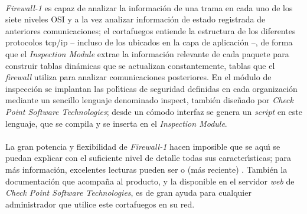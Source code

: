 \\{\it Firewall-1} es capaz de analizar la informaci\'on de una trama en cada
uno de los siete niveles OSI y a la vez analizar informaci\'on de estado 
registrada de anteriores comunicaciones; el cortafuegos entiende la estructura
de los diferentes protocolos {\sc tcp/ip} -- incluso de los ubicados en la
capa de aplicaci\'on --, de forma que el {\it Inspection Module} extrae 
la informaci\'on relevante de cada paquete para construir tablas din\'amicas
que se actualizan constantemente, tablas que el {\it firewall} utiliza para
analizar comunicaciones posteriores. En el m\'odulo de inspecci\'on se 
implantan las pol\'{\i}ticas de seguridad definidas en cada organizaci\'on
mediante un sencillo lenguaje denominado {\sc inspect}, tambi\'en dise\~nado
por {\it Check Point Software Technologies}; desde un c\'omodo interfaz se 
genera un {\it script} en este lenguaje, que se compila y se inserta en el {\it 
Inspection Module}.\\
\\La gran potencia y flexibilidad de {\it Firewall-1} hacen imposible que se
aqu\'{\i} se puedan explicar con el suficiente nivel de detalle todas sus 
caracter\'{\i}sticas; para m\'as informaci\'on, excelentes lecturas pueden ser 
\cite{kn:gon99} o (m\'as reciente) \cite{kn:phone02}. Tambi\'en la 
documentaci\'on que acompa\~na al producto, y la disponible en el servidor
{\it web} de {\it Check Point Software Technologies}, es de gran ayuda para
cualquier administrador que utilice este cortafuegos en su red.
